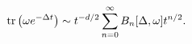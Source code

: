 \begin{equation}
{\rm tr}\left(\omega e^{-\Delta t}\right)\sim t^{-d/2}\sum_{n=0}^\infty
B_n[\Delta,\omega]t^{n/2}.
\end{equation}

